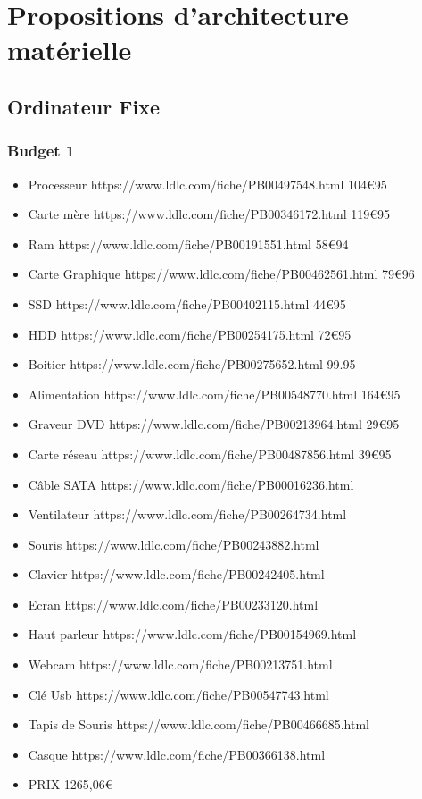 \chapter{Propositions d'architecture matérielle}

\section{Ordinateur Fixe}

\subsection{Budget 1}

\begin{itemize}
	\item Processeur https://www.ldlc.com/fiche/PB00497548.html 104€95
	\item Carte mère https://www.ldlc.com/fiche/PB00346172.html 119€95
	\item Ram https://www.ldlc.com/fiche/PB00191551.html 58€94
	\item Carte Graphique https://www.ldlc.com/fiche/PB00462561.html 79€96
	\item SSD https://www.ldlc.com/fiche/PB00402115.html 44€95
	\item HDD https://www.ldlc.com/fiche/PB00254175.html 72€95
	\item Boitier https://www.ldlc.com/fiche/PB00275652.html 99.95
	\item Alimentation https://www.ldlc.com/fiche/PB00548770.html 164€95
	\item Graveur DVD https://www.ldlc.com/fiche/PB00213964.html 29€95
	\item Carte réseau https://www.ldlc.com/fiche/PB00487856.html 39€95
	\item Câble SATA https://www.ldlc.com/fiche/PB00016236.html
	\item Ventilateur https://www.ldlc.com/fiche/PB00264734.html
	\item Souris https://www.ldlc.com/fiche/PB00243882.html
	\item Clavier https://www.ldlc.com/fiche/PB00242405.html
	\item Ecran https://www.ldlc.com/fiche/PB00233120.html
	\item Haut parleur https://www.ldlc.com/fiche/PB00154969.html
	\item Webcam https://www.ldlc.com/fiche/PB00213751.html
	\item Clé Usb https://www.ldlc.com/fiche/PB00547743.html
	\item Tapis de Souris https://www.ldlc.com/fiche/PB00466685.html
	\item Casque https://www.ldlc.com/fiche/PB00366138.html
	\item PRIX 1265,06\euro
\end{itemize}

